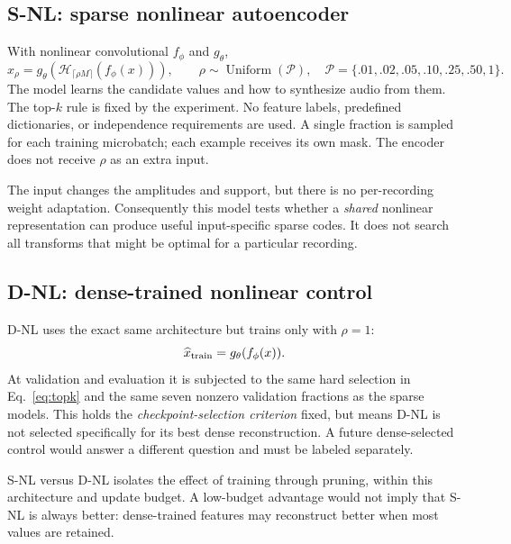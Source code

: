 \documentclass[11pt,a4paper]{article}
\begin{document}
\subsection{S-NL: sparse nonlinear autoencoder}
With nonlinear convolutional $f_\phi$ and $g_\theta$,
\begin{equation}
 \widehat x_\rho=g_\theta\!\left(\mathcal H_{\lceil\rho M\rceil}(f_\phi(x))\right),\qquad
 \rho\sim\operatorname{Uniform}(\mathcal P),
 \quad\mathcal P=\{.01,.02,.05,.10,.25,.50,1\}.
 \label{eq:snl}
\end{equation}
The model learns the candidate values and how to synthesize audio from them. The top-$k$ rule is fixed by the experiment. No feature labels, predefined dictionaries, or independence requirements are used. A single fraction is sampled for each training microbatch; each example receives its own mask. The encoder does not receive $\rho$ as an extra input.

The input changes the amplitudes and support, but there is no per-recording weight adaptation. Consequently this model tests whether a \emph{shared} nonlinear representation can produce useful input-specific sparse codes. It does not search all transforms that might be optimal for a particular recording.

\subsection{D-NL: dense-trained nonlinear control}
D-NL uses the exact same architecture but trains only with $\rho=1$:
\begin{equation}
 \widehat x_{\rm train}=g_\theta(f_\phi(x)).
\end{equation}
At validation and evaluation it is subjected to the same hard selection in Eq.~\eqref{eq:topk} and the same seven nonzero validation fractions as the sparse models. This holds the \emph{checkpoint-selection criterion} fixed, but means D-NL is not selected specifically for its best dense reconstruction. A future dense-selected control would answer a different question and must be labeled separately.

S-NL versus D-NL isolates the effect of training through pruning, within this architecture and update budget. A low-budget advantage would not imply that S-NL is always better: dense-trained features may reconstruct better when most values are retained.
\end{document}

